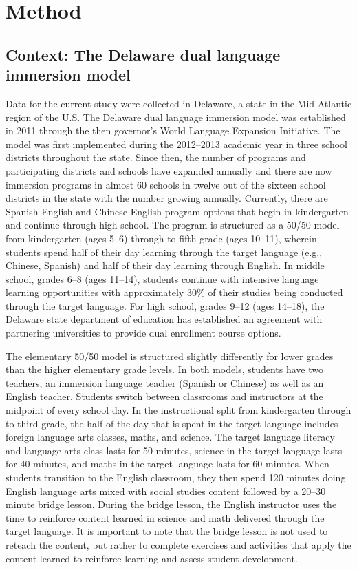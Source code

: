 \documentclass[output=paper,chinesefont]{langscibook}
\begin{document}
\section{Method}
\subsection{Context: The Delaware dual language immersion model}

Data for the current study were collected in Delaware, a state in the Mid-Atlantic region of the U.S. The Delaware dual language immersion model was established in 2011 through the then governor’s World Language Expansion Initiative. The model was first implemented during the 2012--2013 academic year in three school districts throughout the state. Since then, the number of programs and participating districts and schools have expanded annually and there are now immersion programs in almost 60 schools in twelve out of the sixteen school districts in the state with the number growing annually. Currently, there are Spanish-English and Chinese-English program options that begin in kindergarten and continue through high school. The program is structured as a 50/50 model from kindergarten (ages 5--6) through to fifth grade (ages 10--11), wherein students spend half of their day learning through the target language (e.g., Chinese, Spanish) and half of their day learning through English. In middle school, grades 6--8 (ages 11--14), students continue with intensive language learning opportunities with approximately 30\% of their studies being conducted through the target language. For high school, grades 9--12 (ages 14--18), the Delaware state department of education has established an agreement with partnering universities to provide dual enrollment course options.

The elementary 50/50 model is structured slightly differently for lower grades than the higher elementary grade levels. In both models, students have two teachers, an immersion language teacher (Spanish or Chinese) as well as an English teacher. Students switch between classrooms and instructors at the midpoint of every school day. In the instructional split from kindergarten through to third grade, the half of the day that is spent in the target language includes foreign language arts classes, maths, and science. The target language literacy and language arts class lasts for 50 minutes, science in the target language lasts for 40 minutes, and maths in the target language lasts for 60 minutes. When students transition to the English classroom, they then spend 120 minutes doing English language arts mixed with social studies content followed by a 20--30 minute bridge lesson. During the bridge lesson, the English instructor uses the time to reinforce content learned in science and math delivered through the target language. It is important to note that the bridge lesson is not used to reteach the content, but rather to complete exercises and activities that apply the content learned to reinforce learning and assess student development.
\end{document}
